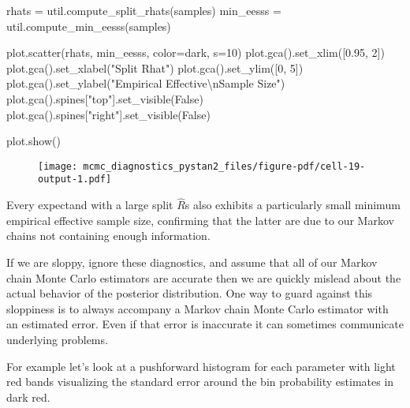 \documentclass[
  letterpaper,
  DIV=11,
  numbers=noendperiod]{scrartcl}
\newenvironment{Shaded}{\begin{snugshade}}{\end{snugshade}}
\newcommand{\CharTok}[1]{\textcolor[rgb]{0.13,0.47,0.30}{#1}}
\newcommand{\DecValTok}[1]{\textcolor[rgb]{0.68,0.00,0.00}{#1}}
\newcommand{\FloatTok}[1]{\textcolor[rgb]{0.68,0.00,0.00}{#1}}
\newcommand{\NormalTok}[1]{\textcolor[rgb]{0.00,0.23,0.31}{#1}}
\newcommand{\OperatorTok}[1]{\textcolor[rgb]{0.37,0.37,0.37}{#1}}
\newcommand{\StringTok}[1]{\textcolor[rgb]{0.13,0.47,0.30}{#1}}
\newcommand{\VariableTok}[1]{\textcolor[rgb]{0.07,0.07,0.07}{#1}}
\begin{document}
\begin{Shaded}
\begin{Highlighting}[]
\NormalTok{rhats }\OperatorTok{=}\NormalTok{ util.compute\_split\_rhats(samples)}
\NormalTok{min\_eesss }\OperatorTok{=}\NormalTok{ util.compute\_min\_eesss(samples)}

\NormalTok{plot.scatter(rhats, min\_eesss, color}\OperatorTok{=}\NormalTok{dark, s}\OperatorTok{=}\DecValTok{10}\NormalTok{)}
\NormalTok{plot.gca().set\_xlim([}\FloatTok{0.95}\NormalTok{, }\DecValTok{2}\NormalTok{])}
\NormalTok{plot.gca().set\_xlabel(}\StringTok{"Split Rhat"}\NormalTok{)}
\NormalTok{plot.gca().set\_ylim([}\DecValTok{0}\NormalTok{, }\DecValTok{5}\NormalTok{])}
\NormalTok{plot.gca().set\_ylabel(}\StringTok{"Empirical Effective}\CharTok{\textbackslash{}n}\StringTok{Sample Size"}\NormalTok{)}
\NormalTok{plot.gca().spines[}\StringTok{"top"}\NormalTok{].set\_visible(}\VariableTok{False}\NormalTok{)}
\NormalTok{plot.gca().spines[}\StringTok{"right"}\NormalTok{].set\_visible(}\VariableTok{False}\NormalTok{)}

\NormalTok{plot.show()}
\end{Highlighting}
\end{Shaded}

\begin{figure}[H]

{\centering \texttt{[image: mcmc\_diagnostics\_pystan2\_files/figure-pdf/cell-19-output-1.pdf]}

}

\end{figure}

Every expectand with a large split \(\hat{R}\)s also exhibits a
particularly small minimum empirical effective sample size, confirming
that the latter are due to our Markov chains not containing enough
information.

If we are sloppy, ignore these diagnostics, and assume that all of our
Markov chain Monte Carlo estimators are accurate then we are quickly
mislead about the actual behavior of the posterior distribution. One way
to guard against this sloppiness is to always accompany a Markov chain
Monte Carlo estimator with an estimated error. Even if that error is
inaccurate it can sometimes communicate underlying problems.

For example let's look at a pushforward histogram for each parameter
with light red bands visualizing the standard error around the bin
probability estimates in dark red.
\end{document}
